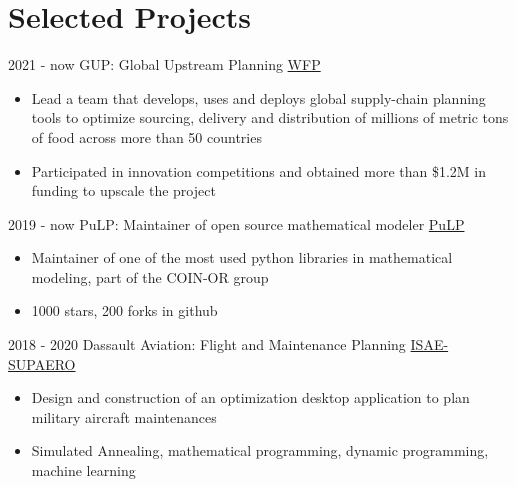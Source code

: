 \documentclass[letterpaper]{twentysecondcv} %
\begin{document}
\section{Selected Projects}
\begin{twenty}
  \twentyitem
      {2021 - now}
    {}
        {GUP: Global Upstream Planning}
        {\href{https://www.wfp.org/}{WFP}}
        {}
        {
        {\begin{itemize}
        \item Lead a team that develops, uses and deploys global supply-chain planning tools to optimize sourcing, delivery and distribution of millions of metric tons of food across more than 50 countries
        \item Participated in innovation competitions and obtained more than \$1.2M in funding to upscale the project
        \vspace{2mm}
        \end{itemize}}
        }
  \twentyitem
      {2019 - now}
    {}
        {PuLP: Maintainer of open source mathematical modeler}
        {\href{https://github.com/coin-or/pulp}{PuLP}}
        {}
        {
        {\begin{itemize}
        \item Maintainer of one of the most used python libraries in mathematical modeling, part of the COIN-OR group
        \item 1000 stars, 200 forks in github
        \vspace{2mm}
        \end{itemize}}
        }
  \twentyitem
      {2018 - 2020}
    {}
        {Dassault Aviation: Flight and Maintenance Planning}
        {\href{https://www.isae-supaero.fr/en/}{ISAE-SUPAERO}}
        {}
        {
        {\begin{itemize}
        \item Design and construction of an optimization desktop application to plan military aircraft maintenances
        \item Simulated Annealing, mathematical programming, dynamic programming, machine learning
        \vspace{2mm}
        \end{itemize}}
        }

\end{twenty}
\end{document}
